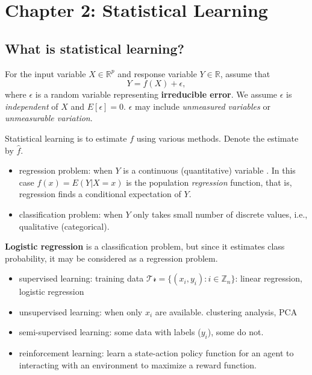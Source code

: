 \documentclass[
  letterpaper,
  DIV=11,
  numbers=noendperiod]{scrreprt}
\providecommand{\tightlist}{%
  \setlength{\itemsep}{0pt}\setlength{\parskip}{0pt}}\usepackage{longtable,booktabs,array}
\begin{document}

\chapter{Chapter 2: Statistical
Learning}\label{chapter-2-statistical-learning}

\section{What is statistical
learning?}\label{what-is-statistical-learning}

For the input variable \(X\in \mathbb{R}^p\) and response variable
\(Y\in \mathbb{R}\), assume that \[Y=f(X) + \epsilon, \] where
\(\epsilon\) is a random variable representing \textbf{irreducible
error}. We assume \(\epsilon\) is \emph{independent} of \(X\) and
\(E[\epsilon]=0\). \(\epsilon\) may include \emph{unmeasured variables}
or \emph{unmeasurable variation}.

Statistical learning is to estimate \(f\) using various methods. Denote
the estimate by \(\hat{f}\).

\begin{itemize}
\tightlist
\item
  regression problem: when \(Y\) is a continuous (quantitative) variable
  . In this case \(f(x)=E(Y|X=x)\) is the population \emph{regression}
  function, that is, regression finds a conditional expectation of
  \(Y\).
\item
  classification problem: when \(Y\) only takes small number of discrete
  values, i.e., qualitative (categorical).
\end{itemize}

\textbf{Logistic regression} is a classification problem, but since it
estimates class probability, it may be considered as a regression
problem.

\begin{itemize}
\tightlist
\item
  supervised learning: training data
  \(\mathcal{Tr}=\{(x_i, y_i):i\in \mathbb{Z}_n\}\): linear regression,
  logistic regression
\item
  unsupervised learning: when only \(x_i\) are available. clustering
  analysis, PCA
\item
  semi-supervised learning: some data with labels (\(y_i\)), some do
  not.
\item
  reinforcement learning: learn a state-action policy function for an
  agent to interacting with an environment to maximize a reward
  function.
\end{itemize}
\end{document}
